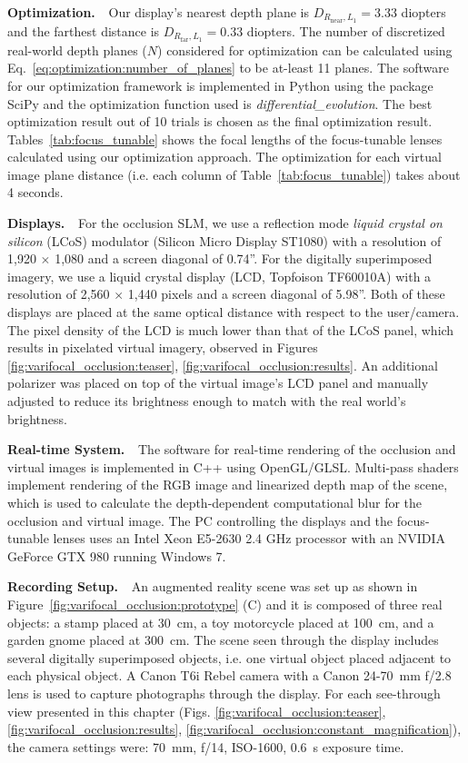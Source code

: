 {\bf Optimization. $\,\,$} 
Our display's nearest depth plane is $D_{R_{\text{near}},L_1} = 3.33$ diopters and the farthest distance is $D_{R_{\text{far}},L_1}=0.33$ diopters. The number of discretized real-world depth planes ($N$) considered for optimization can be calculated using Eq.~\eqref{eq:optimization:number_of_planes} to be at-least 11 planes. 
The software for our optimization framework is implemented in Python using the package SciPy and the optimization function used is \emph{differential\_evolution}. The best optimization result out of 10 trials is chosen as the final optimization result. Tables~\ref{tab:focus_tunable} shows the focal lengths of the focus-tunable lenses calculated using our optimization approach. The optimization for each virtual image plane distance (i.e. each column of Table~\ref{tab:focus_tunable}) takes about 4 seconds.

{\bf Displays. $\,\,$}  For the occlusion SLM, we use a reflection mode \emph{liquid crystal on silicon} (LCoS) modulator (Silicon Micro Display ST1080) with a resolution of 1,920 $\times$ 1,080 and a screen diagonal of 0.74''. For the digitally superimposed imagery, we use a liquid crystal display (LCD, Topfoison TF60010A) with a resolution of 2,560 $\times$ 1,440 pixels and a screen diagonal of 5.98''. Both of these displays are placed at the same optical distance with respect to the user/camera. The pixel density of the LCD is much lower than that of the LCoS panel, which results in pixelated virtual imagery, observed in Figures \ref{fig:varifocal_occlusion:teaser}, \ref{fig:varifocal_occlusion:results}. An additional polarizer was placed on top of the virtual image's LCD panel and manually adjusted to reduce its brightness enough to match with the real world's brightness.


{\bf Real-time System. $\,\,$} The software for real-time rendering of the occlusion and virtual images is implemented in C++ using OpenGL/GLSL. Multi-pass shaders implement rendering of the RGB image and linearized depth map of the scene, which is used to calculate the depth-dependent computational blur for the occlusion and virtual image. The PC controlling the displays and the focus-tunable lenses uses an Intel Xeon E5-2630 2.4 GHz processor with an NVIDIA GeForce GTX 980 running Windows 7. 


{\bf Recording Setup. $\,\,$} An augmented reality scene was set up as shown in Figure~\ref{fig:varifocal_occlusion:prototype} (C) and it is composed of three real objects: a stamp placed at 30~cm, a toy motorcycle placed at 100~cm, and a garden gnome placed at 300~cm. The scene seen through the display includes several digitally superimposed objects, i.e. one virtual object placed adjacent to each physical object. A Canon T6i Rebel camera with a Canon 24-70~mm f/2.8 lens is used to capture photographs through the display. For each see-through view presented in this chapter (Figs. \ref{fig:varifocal_occlusion:teaser}, \ref{fig:varifocal_occlusion:results}, \ref{fig:varifocal_occlusion:constant_magnification}), the camera settings were: 70~mm, f/14, ISO-1600, 0.6~s exposure time. 


